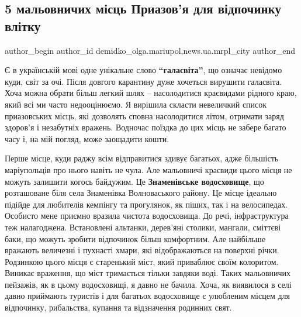  
 
 
 
 
 
\subsection{5 мальовничих місць Приазов'я для відпочинку влітку}
\label{sec:26_06_2020.stz.news.ua.mrpl_city.1.5_maljovnychyh_misc_priazovja_vlitku}
 
\ifcmt
 author_begin
   author_id demidko_olga.mariupol,news.ua.mrpl_city
 author_end
\fi

Є в українській мові одне унікальне слово \textbf{\enquote{галасвіта}}, що означає невідомо
куди, світ за очі. Після довгого карантину дуже хочеться вирушити галасвіта.
Хоча можна обрати більш легкий шлях – насолодитися краєвидами рідного краю,
який всі ми часто недооцінюємо. Я вирішила  скласти невеличкий список
приазовських місць, які дозволять сповна насолодитися літом, отримати заряд
здоров'я і незабутніх вражень. Водночас поїздка до цих місць не забере багато
часу і, на мій погляд, може заощадити кошти.


Перше місце, куди раджу всім відправитися здивує багатьох, адже більшість
маріупольців про нього навіть не чула. Але мальовничі краєвиди цього місця не
можуть залишити когось байдужим. Це \textbf{Знаменівське водосховище}, що розташоване
біля села Знаменівка Волноваського району. Це місце ідеально підійде для
любителів кемпінгу та прогулянок, як піших, так і на велосипедах. Особисто мене
приємно вразила чистота водосховища. До речі, інфраструктура теж налагоджена.
Встановлені альтанки, дерев'яні столики, мангали, сміттєві баки, що можуть
зробити відпочинок більш комфортним. Але найбільше вражають величезні і
пухнасті хмари, які відображаються на поверхні річки. Родзинкою цього місця є
старенький міст, який приваблює своїм колоритом. Виникає враження, що міст
тримається тільки завдяки воді. Таких мальовничих пейзажів, як в цьому
водосховищі, я давно не бачила. Хоча, як виявилося в селі давно приймають
туристів і для багатьох  водосховище є улюбленим  місцем для відпочинку,
рибальства, купання та відзначення родинних свят.


